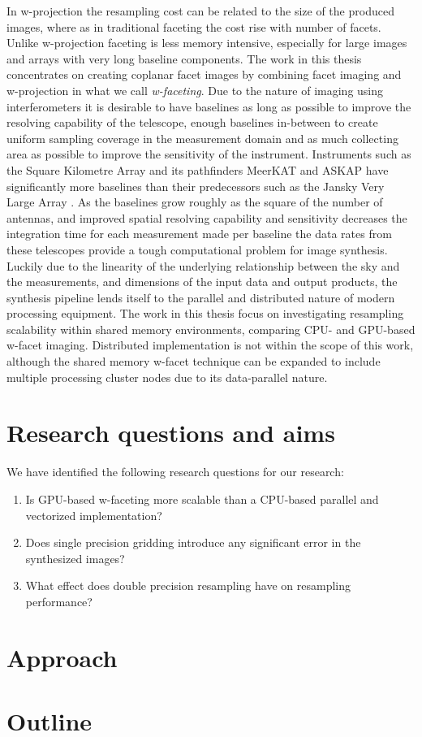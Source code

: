 In w-projection the resampling cost can be related to the size of the produced images, where as in traditional faceting the cost rise with number of facets. Unlike w-projection faceting 
is less memory intensive, especially for large images and arrays with very long baseline components. The work in this thesis concentrates on creating coplanar facet images by combining facet 
imaging and w-projection in what we call \textit{w-faceting}. Due to the nature of imaging using interferometers it is desirable to have baselines as long as possible to improve the resolving
capability of the telescope, enough baselines in-between to create uniform sampling coverage in the measurement domain and as much collecting area as possible to improve the sensitivity of 
the instrument. Instruments such as the Square Kilometre Array \cite{carilli2004science} and its pathfinders MeerKAT \cite{booth2009meerkat} and ASKAP \cite{johnston2008science} have significantly more
baselines than their predecessors such as the Jansky Very Large Array \cite{2041-8205-739-1-L1}. As the baselines grow roughly as the square of the number of antennas, and improved spatial resolving 
capability and sensitivity decreases the integration time for each measurement made per baseline the data rates from these telescopes provide a tough computational problem for image synthesis. Luckily due to
the linearity of the underlying relationship between the sky and the measurements, and dimensions of the input data and output products, the synthesis pipeline lends itself to the parallel and 
distributed nature of modern processing equipment. The work in this thesis focus on investigating resampling scalability within shared memory environments, comparing CPU- and GPU-based w-facet imaging.
Distributed implementation is not within the scope of this work, although the shared memory w-facet technique can be expanded to include multiple processing cluster nodes due to its data-parallel 
nature.
\section{Research questions and aims}
We have identified the following research questions for our research:
\begin{enumerate}
 \item Is GPU-based w-faceting more scalable than a CPU-based parallel and vectorized implementation?
 \item Does single precision gridding introduce any significant error in the synthesized images?
 \item What effect does double precision resampling have on resampling performance?
\end{enumerate}


\section{Approach}
\section{Outline}
